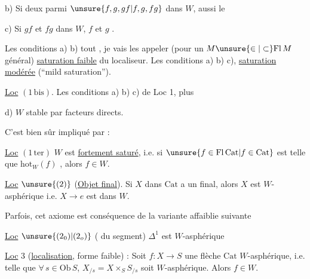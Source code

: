 b) Si deux parmi $\unsure{f,g,gf|f,g,fg}$ dans $W$, aussi le 

c) Si $gf$ et $fg$  dans $W$, $f$ et $g$ .

Les conditions a)  b) tout , je vais les appeler
(pour un $M\unsure{\in|\subset}\mathrm{Fl}\,M$ général) \uline{saturation faible} du
localiseur. Les conditions a) b) c), \uline{saturation modérée}
(``mild saturation''). 

\uline{Loc} $(1\,\mathrm{bis})$. Les conditions a) b) c) de Loc 1, plus

d) $W$ stable par facteurs directs.

C'est bien sûr impliqué par :

\uline{Loc} $(1\,\mathrm{ter})$ $W$ est \uline{fortement saturé}, i.e. si $\unsure{f\in\mathrm{Fl}\,\mathrm{Cat}|f\in\mathrm{Cat}}$ est
telle que $\mathrm{hot}_{W}(f)$ , alors $f\in W$.

 \uline{Loc} $\unsure{(2)}$ (\uline{Objet final}). Si $X$ dans $\mathrm{Cat}$ a un  final,
alors $X$ est $W$-asphérique i.e. $X\longrightarrow e$ est dans $W$.

Parfois, cet axiome est conséquence de la variante
affaiblie suivante

\uline{Loc} $\unsure{(2_0)|(2_o)}$ ( du segment) $\Delta^1$ est $W$-asphérique

\uline{Loc} 3 (\uline{localisation}, forme faible) : Soit $f:X\longrightarrow S$ une
flèche  $\mathrm{Cat}$ $W$-asphérique, i.e. telle que
$\forall\,s\in\mathrm{Ob}\,S$,  $X_{/s}=X\times_S S_{/s}$ soit $W$-asphérique. Alors $f\in W$.


